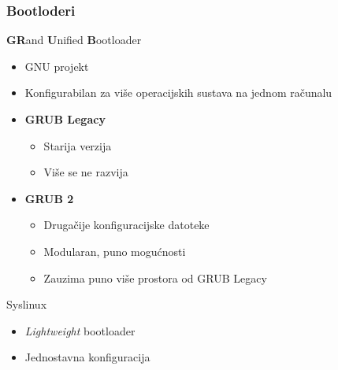 \documentclass[t]{beamer}
\begin{document}
\begin{frame}
	\frametitle{Bootloderi}
	\textbf{GR}and \textbf{U}nified \textbf{B}ootloader
	\begin{itemize}
		\item GNU projekt
		\item Konfigurabilan za više operacijskih sustava na jednom računalu
	\end{itemize}
	\begin{itemize}
		\item \textbf{GRUB Legacy}
		\begin{itemize}
			\item Starija verzija
			\item Više se ne razvija
		\end{itemize}
		\item \textbf{GRUB 2}
		\begin{itemize}
			\item Drugačije konfiguracijske datoteke
			\item Modularan, puno mogućnosti
			\item Zauzima puno više prostora od GRUB Legacy
		\end{itemize}
	\end{itemize}
	\vfill
	Syslinux
	\begin{itemize}
		\item \emph{Lightweight} bootloader
		\item Jednostavna konfiguracija
	\end{itemize}
\end{frame}
\end{document}
